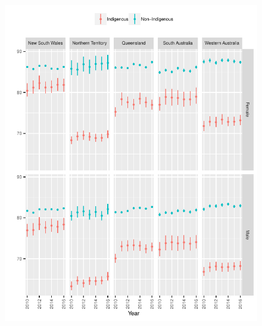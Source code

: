 \documentclass{article}
\begin{document}
\begin{figure}
  \centering
  \includegraphics{out/fig_life_expectancy_Baseline}
\end{figure}
\newpage
\end{document}

